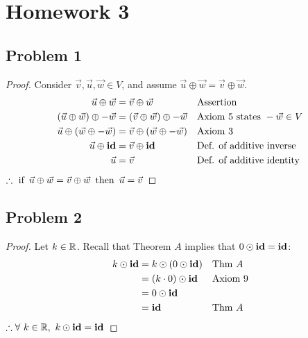 





\section*{Homework 3}

\subsection*{Problem 1}
\begin{proof}
  Consider $\vec{v}, \vec{u}, \vec{w} \in V$, and assume $\vec{u} \oplus \vec{w} = \vec{v} \oplus \vec{w}$.
  \begin{align*}
    \vec{u} \oplus \vec{w}                   & = \vec{v} \oplus \vec{w}                   &  & \text{Assertion}                     \\
    (\vec{u} \oplus \vec{w}) \oplus -\vec{w} & = (\vec{v} \oplus \vec{w}) \oplus -\vec{w} &  & \text{Axiom 5 states}~-\vec{w} \in V \\
    \vec{u} \oplus (\vec{w} \oplus -\vec{w}) & = \vec{v} \oplus (\vec{w} \oplus -\vec{w}) &  & \text{Axiom 3}                       \\
    \vec{u} \oplus \operatorname{\textbf{id}}                       & = \vec{v} \oplus \operatorname{\textbf{id}}                       &  & \text{Def. of additive inverse}      \\
    \vec{u}                                  & = \vec{v}                                  &  & \text{Def. of additive identity}
  \end{align*}
  $\therefore \operatorname{~\text{if}~} \vec{u} \oplus \vec{w} = \vec{v} \oplus \vec{w} \operatorname{~\text{then}~} \vec{u} = \vec{v}$
\end{proof}

\subsection*{Problem 2}
\begin{proof}
  Let $k \in \mathbb{R}$. Recall that Theorem $A$ implies that $0 \odot \operatorname{\textbf{id}} = \operatorname{\textbf{id}}$:
  \begin{align*}
    k \odot \operatorname{\textbf{id}} & = k \odot (0 \odot \operatorname{\textbf{id}}) &  & \text{Thm $A$} \\
                & = (k \cdot 0) \odot \operatorname{\textbf{id}} &  & \text{Axiom 9} \\
                & = 0 \odot \operatorname{\textbf{id}}                               \\
                & = \operatorname{\textbf{id}}                   &  & \text{Thm $A$}
  \end{align*}
  $\therefore \forall~k \in \mathbb{R},~k \odot \operatorname{\textbf{id}} = \operatorname{\textbf{id}}$
\end{proof}

